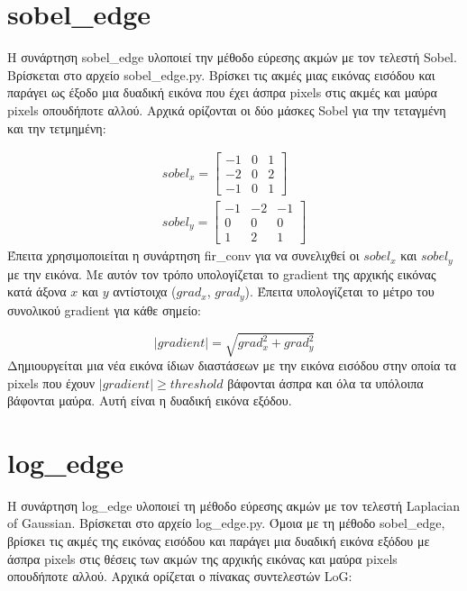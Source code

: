 \documentclass{article}
\begin{document}
\section{sobel\_edge}\label{sobel}
Η συνάρτηση sobel\_edge υλοποιεί την μέθοδο εύρεσης ακμών με τον τελεστή 
Sobel. Βρίσκεται στο αρχείο sobel\_edge.py. Βρίσκει τις ακμές μιας εικόνας
εισόδου και παράγει ως έξοδο μια δυαδική εικόνα που έχει άσπρα pixels στις 
ακμές και μαύρα pixels οπουδήποτε αλλού. Αρχικά ορίζονται οι δύο μάσκες Sobel
για την τεταγμένη και την τετμημένη:

\begin{gather}
    sobel_x = \left[\begin{matrix}
        -1& 0& 1 \\
        -2& 0& 2 \\
        -1& 0& 1
    \end{matrix}\right] \\
    sobel_y = \left[\begin{matrix}
        -1& -2& -1 \\
         0&  0&  0 \\
         1&  2&  1
    \end{matrix}\right] 
\end{gather}
Έπειτα χρησιμοποιείται η συνάρτηση fir\_conv για να συνελιχθεί οι $sobel_x$ και
$sobel_y$ με την εικόνα. Με αυτόν τον τρόπο υπολογίζεται το gradient της αρχικής
εικόνας κατά άξονα $x$ και $y$ αντίστοιχα ($grad_x$, $grad_y$). Έπειτα υπολογίζεται 
το μέτρο του συνολικού gradient για κάθε σημείο:

\begin{equation}
    |gradient| = \sqrt{grad_x^2 + grad_y^2}
\end{equation}
Δημιουργείται μια νέα εικόνα ίδιων διαστάσεων με την εικόνα εισόδου στην οποία 
τα pixels που έχουν $|gradient| \geq threshold$ βάφονται άσπρα και όλα τα 
υπόλοιπα βάφονται μαύρα. Αυτή είναι η δυαδική εικόνα εξόδου.

\section{log\_edge}\label{log}
H συνάρτηση log\_edge υλοποιεί τη μέθοδο εύρεσης ακμών με τον τελεστή
Laplacian of Gaussian. Βρίσκεται στο αρχείο log\_edge.py. Όμοια με τη 
μέθοδο sobel\_edge, βρίσκει τις ακμές της εικόνας εισόδου και 
παράγει μια δυαδική εικόνα εξόδου με άσπρα pixels στις θέσεις των ακμών
της αρχικής εικόνας και μαύρα pixels οπουδήποτε αλλού. Αρχικά ορίζεται 
ο πίνακας συντελεστών LoG:
\end{document}
